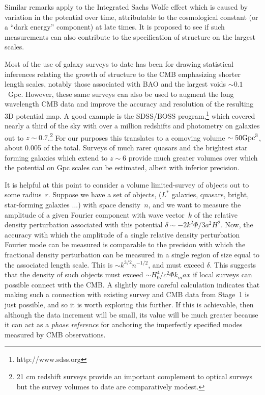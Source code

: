 \documentclass[psfig,12pt]{article}
\def\ni{\noindent}
\begin{document}
{Similar remarks apply to the Integrated Sachs Wolfe effect which is
caused by variation in the potential over time, attributable to the
cosmological constant (or a ``dark energy'' component) at late times.
It is proposed to see if such
measurements can also contribute to the specification of structure on
the largest scales.

\ni{\bf Galaxy Surveys and the ``Local'' Universe:}
Most of the use of galaxy surveys to date has been for drawing statistical inferences
relating the growth of structure to the CMB emphasizing shorter length
scales, notably those associated with BAO and the largest voids
$\sim0.1$~Gpc. However, these same surveys can also be used to augment
the long wavelength CMB data and improve the accuracy and resolution of
the resulting 3D potential map. A good example is the SDSS/BOSS
program,\footnote{http://www.sdss.org} which covered nearly a third of
the sky with over a million redshifts and photometry on galaxies out to
$z\sim0.7$.\footnote{21 cm redshift surveys provide an important
complement to optical surveys but the survey volumes to date are
comparatively modest.} For our purposes this translates to a comoving
volume $\sim50{\rm Gpc}^3$, about 0.005 of the total. Surveys of much
rarer quasars and the brightest star forming galaxies which extend to
$z\sim6$ provide much greater volumes over which the potential on Gpc
scales can be estimated, albeit with inferior precision.

It is helpful at this point to consider a volume limited-survey of
objects out to some radius~$r$. Suppose we have a set of objects,
($L^\ast$ galaxies, quasars, bright, star-forming galaxies $\dots$) with
space density~$n$, and we want to measure the amplitude of a given
Fourier component with wave vector~$k$ of the relative density
perturbation associated with this potential
$\delta\sim-2k^2\Phi/3a^2H^2$. Now, the accuracy with which the amplitude
of a single relative density perturbation Fourier mode can be measured
is comparable to the precision with which the fractional density
perturbation can be measured in a single region of size equal to the
associated length scale. This is $\sim k^{3/2}n^{-1/2}$, and must exceed
$\delta$. This suggests that the density of such objects must exceed
$\sim H_0^4/c^2\Phi k_max$ if local surveys can possible connect with
the CMB. A slightly more careful calculation indicates that making such
a connection with existing survey and CMB data from Stage~1 is just
possible, and so it is worth exploring this further. If this is
achievable, then although the data increment will be small, its value
will be much greater because it can act as a {\it phase reference} for
anchoring the imperfectly specified modes measured by CMB observations.

}
\end{document}
